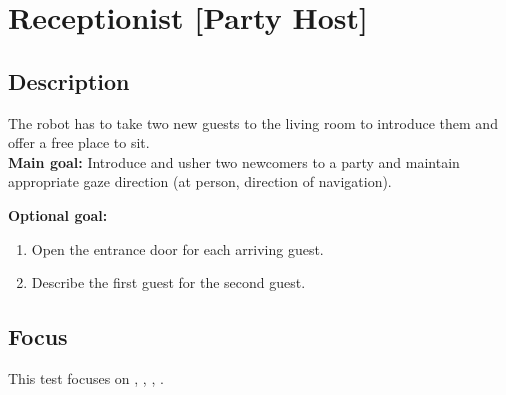 \section{Receptionist [Party Host]}
\label{test:receptionist}
\subsection*{Description}

    The robot has to take two new guests to the living room to introduce them and offer a free place to sit.\\


\textbf{Main goal:}
    Introduce and usher two newcomers to a party and maintain appropriate gaze direction (at person, direction of navigation).


\textbf{Optional goal:}
\begin{enumerate}[nosep]
	\item Open the entrance door for each arriving guest.
	\item Describe the first guest for the second guest.
\end{enumerate}

\subsection*{Focus}
This test focuses on \SysI{}, \HRI{}, \PerDet{}, \PerRec. 

